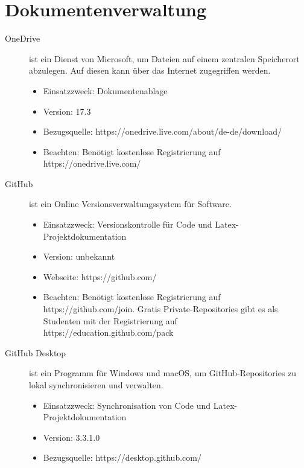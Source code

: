 
\section{Dokumentenverwaltung}

\begin{description}
	\item [OneDrive] ist ein Dienst von Microsoft, um Dateien auf einem zentralen Speicherort abzulegen. Auf diesen kann über das Internet zugegriffen werden. \cite{wikipedia_filehosting} \cite{wikipedia_oneDrive}
	\begin{itemize}
		\item Einsatzzweck: Dokumentenablage
		\item Version: 17.3
		\item Bezugsquelle: https://onedrive.live.com/about/de-de/download/
		\item Beachten: Benötigt kostenlose Registrierung auf https://onedrive.live.com/
	\end{itemize}
	
	
	\item [GitHub] ist ein Online Versionsverwaltungssystem für Software.
	\begin{itemize}
		\item Einsatzzweck: Versionskontrolle für Code und Latex-Projektdokumentation
		\item Version: unbekannt
		\item Webseite: https://github.com/
		\item Beachten: Benötigt kostenlose Registrierung auf https://github.com/join. Gratis Private-Repositories gibt es als Studenten mit der Registrierung auf https://education.github.com/pack
	\end{itemize}
	
	
	\item [GitHub Desktop] ist ein Programm für Windows und macOS, um GitHub-Repositories zu lokal synchronisieren und verwalten.
	\begin{itemize}
		\item Einsatzzweck: Synchronisation von Code und Latex-Projektdokumentation
		\item Version: 3.3.1.0
		\item Bezugsquelle: https://desktop.github.com/
	\end{itemize}
\end{description}



